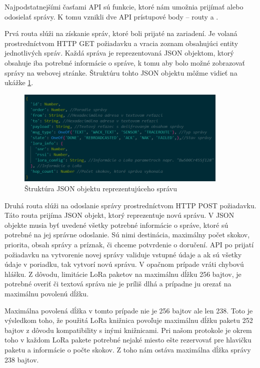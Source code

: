 \documentclass[slovak,master]{diploma}
\begin{document}
Najpodstatnejšími časťami API sú funkcie, ktoré nám umožnia prijímať alebo odosielať správy. K tomu vznikli dve 
API prístupové body -- routy  a .

Prvá routa slúži na získanie správ, ktoré boli prijaté na zariadení. Je volaná prostredníctvom HTTP GET požiadavku a 
vracia zoznam obsahujúci entity jednotlivých správ. Každá správa je reprezentovaná JSON objektom, ktorý obsahuje 
iba potrebné informácie o správe, k tomu aby bolo možné zobrazovať správy na webovej stránke. Štruktúru tohto JSON 
objektu môžme vidieť na ukážke \ref{fig:messageObj}.

\begin{figure}[h!]
	\centering
	\includegraphics[width=0.9\textwidth]{Figures/msgObject.png}
	\caption{Štruktúra JSON objektu reprezentujúceho správu}
	\label{fig:messageObj}
\end{figure}

Druhá routa slúži na odoslanie správy prostredníctvom HTTP POST požiadavku. Táto routa prijíma JSON objekt, ktorý reprezentuje novú správu.
V JSON objekte musia byť uvedené všetky potrebné informácie o správe, ktoré sú potrebné na jej správne odoslanie. 
Sú nimi destinácia, maximálny počet skokov, priorita, obsah správy a príznak, či chceme potvrdenie o doručení. 
API po prijatí požiadavku na vytvorenie novej správy validuje vstupné údaje a ak sú všetky údaje v poriadku, tak vytvorí novú správu. V 
opačnom prípade vráti chybovú hlášku. Z dôvodu, limitácie LoRa paketov na maximálnu dĺžku 256 bajtov, je potrebné overiť či textová správa 
nie je príliš dlhá a prípadne ju orezať na maximálnu povolenú dĺžku.

Maximálna povolená dĺžka v tomto prípade nie je 256 bajtov ale len 238. Toto je výsledkom toho, 
že použitá LoRa knižnica povoľuje maximálnu dĺžku paketu 252 bajtov z dôvodu kompatibility s inými knižnicami.
Pri našom protokole je okrem toho v každom LoRa pakete potrebné nejaké miesto ešte rezervovať pre hlavičku paketu a informácie o počte skokov.
Z toho nám ostáva maximálna dĺžka správy 238 bajtov.
\end{document}

